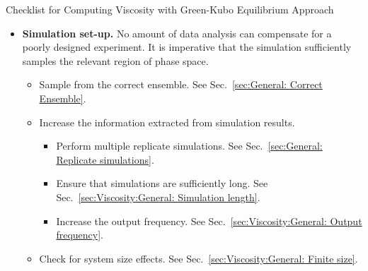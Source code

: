 \documentclass[9pt,bestpractices]{livecoms}
\begin{document}
\begin{Checklists*}[p!]
	\begin{checklist}{Checklist for Computing Viscosity with Green-Kubo Equilibrium Approach}
		\begin{itemize}
			\item
			\textbf{Simulation set-up.} No amount of data analysis can compensate for a poorly designed experiment. It is imperative that the simulation sufficiently samples the relevant region of phase space.
			\begin{itemize}
				\item Sample from the correct ensemble. See Sec.\ \ref{sec:General: Correct Ensemble}.
				\item Increase the information extracted from simulation results.
				\begin{itemize}
					\item Perform multiple replicate simulations. See Sec.\ \ref{sec:General: Replicate simulations}.
					\item Ensure that simulations are sufficiently long. See Sec.\ \ref{sec:Viscosity:General: Simulation length}.
					\item Increase the output frequency. See Sec.\ \ref{sec:Viscosity:General: Output frequency}.
				\end{itemize}
				\item Check for system size effects. See Sec.\ \ref{sec:Viscosity:General: Finite size}.
			\end{itemize}
			\vspace{-0.325\baselineskip} %


\end{itemize}
\end{checklist}
\end{Checklists*}
\end{document}
